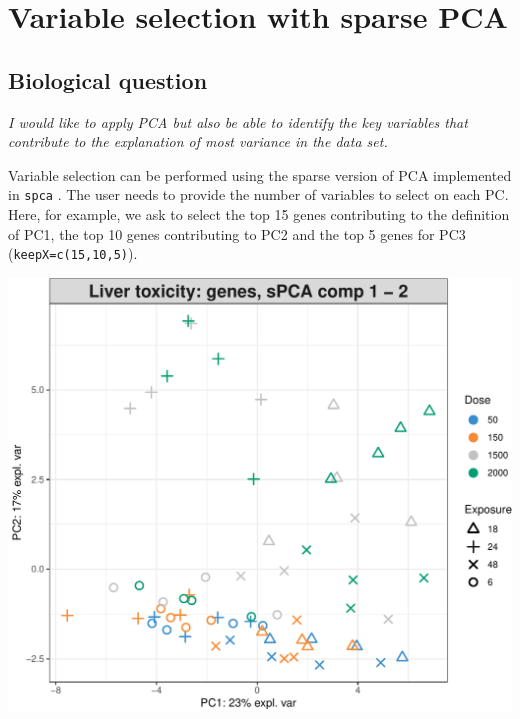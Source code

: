 \documentclass[]{book}
\newenvironment{Shaded}{\begin{snugshade}}{\end{snugshade}}
\newcommand{\CommentTok}[1]{\textcolor[rgb]{0.56,0.35,0.01}{\textit{#1}}}
\newcommand{\DataTypeTok}[1]{\textcolor[rgb]{0.13,0.29,0.53}{#1}}
\newcommand{\DecValTok}[1]{\textcolor[rgb]{0.00,0.00,0.81}{#1}}
\newcommand{\KeywordTok}[1]{\textcolor[rgb]{0.13,0.29,0.53}{\textbf{#1}}}
\newcommand{\NormalTok}[1]{#1}
\newcommand{\OperatorTok}[1]{\textcolor[rgb]{0.81,0.36,0.00}{\textbf{#1}}}
\newcommand{\OtherTok}[1]{\textcolor[rgb]{0.56,0.35,0.01}{#1}}
\newcommand{\StringTok}[1]{\textcolor[rgb]{0.31,0.60,0.02}{#1}}
\begin{document}
\hypertarget{sPCA}{%
\section{Variable selection with sparse PCA}\label{sPCA}}

\hypertarget{biological-question-1}{%
\subsection{Biological question}\label{biological-question-1}}

{
\emph{I would like to apply PCA but also be able to identify the key variables that contribute to the explanation of most variance in the data set.}
}

Variable selection can be performed using the sparse version of PCA implemented in \texttt{spca} \citep{She08}. The user needs to provide the number of variables to select on each PC. Here, for example, we ask to select the top 15 genes contributing to the definition of PC1, the top 10 genes contributing to PC2 and the top 5 genes for PC3 (\texttt{keepX=c(15,10,5)}).

\begin{Shaded}
\end{Shaded}

\begin{center}\includegraphics[width=0.5\linewidth,]{Figures/03-pca-liver-plotIndiv-args-1} \end{center}
\end{document}
